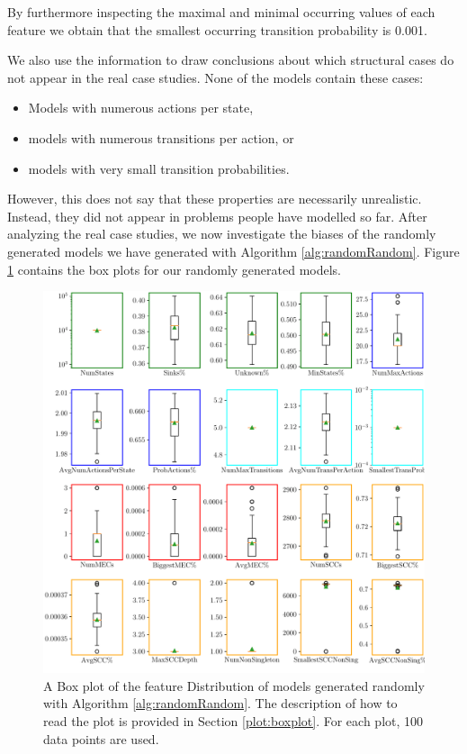 By furthermore inspecting the maximal and minimal occurring values of each feature we obtain that the smallest occurring transition probability is 0.001.

We also use the information to draw conclusions about which structural cases do not appear in the real case studies. 
None of the models contain these cases:
\begin{itemize}
    \item Models with numerous actions per state,
    \item models with numerous transitions per action, or
    \item models with very small transition probabilities.
\end{itemize}
\FloatBarrier
However, this does not say that these properties are necessarily unrealistic. Instead, they did not appear in problems people have modelled so far.
After analyzing the real case studies, we now investigate the biases of the randomly generated models we have generated with Algorithm \ref{alg:randomRandom}.
Figure \ref{fig:Random_FeatureDistribution} contains the box plots for our randomly generated models. 
\begin{figure}[h!]
    \centering
    \includegraphics[width=1\textwidth]{figures/RandomRandom_FeatureDistribution.pdf}
    \caption[Feature Distribution of randomly generated models]{
        A Box plot of the feature Distribution of models generated randomly with Algorithm \ref{alg:randomRandom}. The description of how to read the plot is provided in Section \ref{plot:boxplot}.
        For each plot, 100 data points are used.
    }
    \label{fig:Random_FeatureDistribution}
\end{figure}
 
